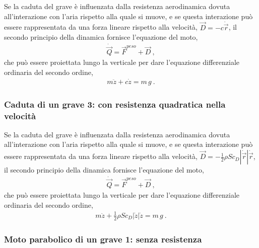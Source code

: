 \documentclass[letterpaper,10pt,italian]{jupyterBook}
\begin{document}
\sphinxAtStartPar
{} Se la caduta del grave è influenzata dalla resistenza aerodinamica dovuta all’interazione con l’aria rispetto alla quale si muove, e se questa interazione può essere rappresentata da una forza lineare rispetto alla velocità, \(\vec{D} = - c \dot{\vec{r}}\), il secondo principio della dinamica fornisce l’equazione del moto,
\begin{equation*}
\begin{split}\dot{\vec{Q}} = \vec{F}^{peso} + \vec{D} \ ,\end{split}
\end{equation*}
\sphinxAtStartPar
che può essere proiettata lungo la verticale per dare l’equazione differenziale ordinaria del secondo ordine,
\begin{equation*}
\begin{split}m \ddot{z} + c \dot{z} = m \, g \ .\end{split}
\end{equation*}\subsubsection*{Caduta di un grave \sphinxhyphen{} 3: con resistenza quadratica nella velocità}

\sphinxAtStartPar
{} Se la caduta del grave è influenzata dalla resistenza aerodinamica dovuta all’interazione con l’aria rispetto alla quale si muove, e se questa interazione può essere rappresentata da una forza lineare rispetto alla velocità, \(\vec{D} = - \frac{1}{2} \rho S c_D |\dot{\vec{r}}| \dot{\vec{r}}\), il secondo principio della dinamica fornisce l’equazione del moto,
\begin{equation*}
\begin{split}\dot{\vec{Q}} = \vec{F}^{peso} + \vec{D} \ ,\end{split}
\end{equation*}
\sphinxAtStartPar
che può essere proiettata lungo la verticale per dare l’equazione differenziale ordinaria del secondo ordine,
\begin{equation*}
\begin{split}m \ddot{z} + \frac{1}{2} \rho S c_D |\dot{z}| \dot{z} = m \, g \ .\end{split}
\end{equation*}\subsubsection*{Moto parabolico di un grave \sphinxhyphen{} 1: senza resistenza}
\end{document}
